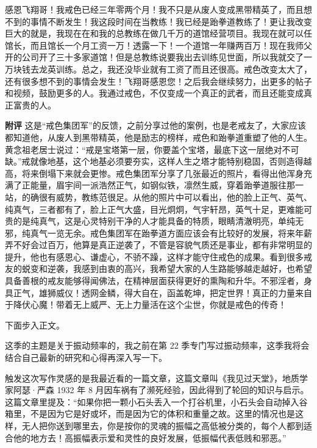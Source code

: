 \begin{case}
    感恩飞翔哥！我戒色已经三年零两个月！我不只是从废人变成黑带精英了，而且想不到的事情不断发生！我这段时间在当教练！我已经是跆拳道教练了！更让我改变巨大的就是，我现在在和我的总教练在做几千万的道馆经营项目。我现在就可以任馆长，而且馆长一个月工资一万！透露一下！一个道馆一年赚两百万！现在我师父开的公司开了三十多家道馆！但是总教练说要我出去训练见世面，所以我就交了一万块钱去龙英训练。总之，我还没毕业就有工资了而且还很高。戒色改变太大了，还有很多想不到的事情会发生！飞翔哥感恩您！之后我会继续努力，出更多的帖子和视频，鼓励更多的人。我通过戒色，不仅变成一个真正的武者，而且还能变成真正富贵的人。

    \textbf{附评} 这是“戒色集团军”的反馈，之前分享过他的案例，也是老戒友了，大家应该都知道他，从废人到黑带精英，他是励志的榜样，戒色和跆拳道重塑了他的人生。黄念祖老居士说过：“戒是宝塔第一层，你要盖个宝塔，最底下这一层绝对不可缺。”戒就像地基，这个地基必须要夯实，这样人生之塔才能特别稳固，否则造得越高，将来倒塌下来就会更惨。戒色集团军分享了几张最近的照片，看得出他浑身充满了正能量，眉宇间一派浩然正气，如钢似铁，凛然生威，穿着跆拳道服往那一站，的确很有威势，教练范很足。从他的照片中可以看出，他的脸上正气、英气、纯真气，三者都有了，脸上正气大盛，目光炯炯，气宇轩昂，英气十足，更难能可贵的是纯真气，这是心灵特别干净的人才能具备的特质，眼睛清澈明亮，单纯无邪，纯真气一览无余。戒色集团军在跆拳道方面应该会有比较好的发展，将来年薪弄不好会过百万，他算是真正逆袭了，不管是容貌气质还是事业，都有非常明显的提升，他也有感恩心、谦虚心，不骄不躁，这样才能守住戒色的成果。看到很多戒友的蜕变和逆袭，我感到由衷的高兴，我希望大家的人生路能够越走越好，也希望具备善根的戒友能够得闻佛法，在精神层面获得更好的熏陶和升华。不邪淫者，身具正气，雄狮威仪！透网金鳞，得大自在，函盖乾坤，把定世界！真正的力量来自于降伏心魔！带着无上威严、无上力量活在这个尘世，你就是戒色的传奇！
\end{case}

下面步入正文。

这季的主题是关于振动频率的，我之前在第 22 季专门写过振动频率，这季我将会结合自己最新的研究和心得再深入写一下。

触发这次写作灵感的是我最近看的一篇文章，这篇文章叫《我见过天堂》，地质学家阿瑟·严森 1932 年 8 月因车祸有了濒死经验，因此得到了轮回的知识与启示。这篇文章里提及：“如果你把一颗小石头丢入一个打谷机里，小石头会自动掉入谷箱里，不是因为它是好或坏，而是因为它的体积和重量之故。这里的情况也是这样，无人把你送到哪里去，你是按你的灵魂的振幅之高低被分类的，每个人都到适合他的地方去！高振幅表示爱和灵性的良好发展，低振幅代表低贱和邪恶。”


